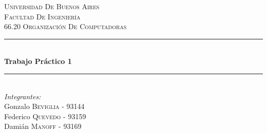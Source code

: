 \documentclass{article}
\begin{document}
\begin{titlepage}

\newcommand{\HRule}{\rule{\linewidth}{0.5mm}} %

\center %
 

\textsc{\LARGE Universidad De Buenos Aires}\\[1.5cm] %
\textsc{\Large Facultad De Ingeniería}\\[0.5cm] %
\textsc{\large 66.20 Organización De Computadoras}\\[0.5cm] %


\HRule \\[0.4cm]
{ \huge \bfseries Trabajo Práctico 1}\\[0.4cm] %
\HRule \\[1.5cm]
 

\Large \emph{Integrantes:}\\
Gonzalo \textsc{Beviglia} - 93144\\ %
Federico \textsc{Quevedo} - 93159\\ %
Damián \textsc{Manoff} - 93169\\[5cm] %



\end{titlepage}
\end{document}
